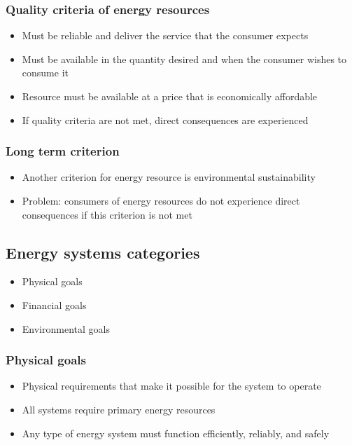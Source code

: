 \documentclass{article}
\begin{document}
\subsubsection{Quality criteria of energy resources}
\begin{itemize}
    \item Must be reliable and deliver the service that the consumer expects
    \item Must be available in the quantity desired and when the consumer wishes to consume it
    \item Resource must be available at a price that is economically affordable
    \item If quality criteria are not met, direct consequences are experienced
\end{itemize}

\subsubsection{Long term criterion}
\begin{itemize}
    \item Another criterion for energy resource is environmental sustainability
    \item Problem: consumers of energy resources do not experience direct consequences if this criterion is not met
\end{itemize}

\subsection{Energy systems categories}
\begin{itemize}
    \item Physical goals
    \item Financial goals
    \item Environmental goals
\end{itemize}

\subsubsection{Physical goals}
\begin{itemize}
    \item Physical requirements that make it possible for the system to operate
    \item All systems require primary energy resources
    \item Any type of energy system must function efficiently, reliably, and safely
\end{itemize}
\end{document}
